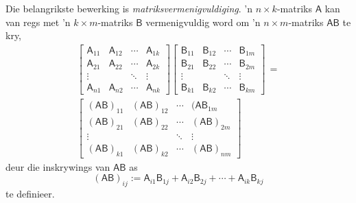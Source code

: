 \documentclass[a4paper,11pt]{book}
\theoremstyle{definition}
\newcommand{\mat}[1]{\mathsf{#1}}
\begin{document}
\begin{appendices}
Die belangrikste bewerking is \emph{matriksvermenigvuldiging}. 'n $n \times
k$-matriks $\mat{A}$ kan van regs met 'n $k \times m$-matriks $\mat{B}$
vermenigvuldig word om 'n $n \times m$-matriks $\mat{AB}$ te kry,
\begin{multline*}
	\left[ 
	\begin{array}{cccc} 
		\mat{A}_{11} & \mat{A}_{12} & \cdots & \mat{A}_{1k} \\
		\mat{A}_{21} & \mat{A}_{22} & \cdots & \mat{A}_{2k} \\
		\vdots & & \ddots & \vdots \\
		\mat{A}_{n1} & \mat{A}_{n2} & \cdots & \mat{A}_{nk} 
	\end{array}
	\right] \left[ 
	\begin{array}{cccc} 
		\mat{B}_{11} & \mat{B}_{12} & \cdots & \mat{B}_{1m} \\
		\mat{B}_{21} & \mat{B}_{22} & \cdots & \mat{B}_{2m} \\
		\vdots & & \ddots & \vdots \\
		\mat{B}_{k1} & \mat{B}_{k2} & \cdots & \mat{B}_{km} 
	\end{array} 
	\right] \, = \\ \left[ 
	\begin{array}{cccc} 
		(\mat{AB})_{11} & (\mat{AB})_{12} & \cdots & (\mat{AB}_{1m} \\
		(\mat{AB})_{21} & (\mat{AB})_{22} & \cdots & (\mat{AB})_{2m} \\
		\vdots & & \ddots & \vdots \\
		(\mat{AB})_{k1} & (\mat{AB})_{k2} & \cdots & (\mat{AB})_{nm} 
	\end{array} 
	\right] 
\end{multline*}
deur die inskrywings van $\mat{AB}$ as
\[
	(\mat{AB})_{ij} := \mat{A}_{i1} \mat{B}_{1j} + \mat{A}_{i2}
	\mat{B}_{2j} + \cdots + \mat{A}_{ik} \mat{B}_{kj}
\]
te definieer.


\end{appendices}
\end{document}
